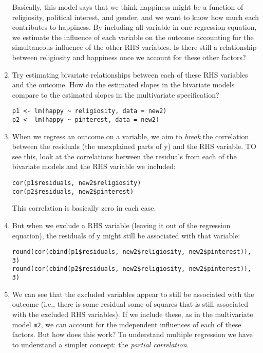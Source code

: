 \documentclass[a4paper,12pt]{article}
\begin{document}
\begin{enumerate}
\noindent Basically, this model says that we think happiness might be a function of religiosity, political interest, and gender, and we want to know how much each contributes to happiness. By including all variable in one regression equation, we estimate the influence of each variable on the outcome accounting for the simultaneous influence of the other RHS variables. Is there still a relationship between religiosity and happiness once we account for these other factors?

\item Try estimating bivariate relationships between each of these RHS variables and the outcome. How do the estimated slopes in the bivariate models compare to the estimated slopes in the multivariate specification?

\begin{verbatim}
p1 <- lm(happy ~ religiosity, data = new2)
p2 <- lm(happy ~ pinterest, data = new2)
\end{verbatim}

\item When we regress an outcome on a variable, we aim to \textit{break} the correlation between the residuals (the unexplained parts of y) and the RHS variable. TO see this, look at the correlations between the residuals from each of the bivariate models and the RHS variable we included:

\begin{verbatim}
cor(p1$residuals, new2$religiosity)
cor(p2$residuals, new2$pinterest)
\end{verbatim}

\noindent This correlation is basically zero in each case.

\item But when we exclude a RHS variable (leaving it out of the regression equation), the residuals of y might still be associated with that variable:

\begin{verbatim}
round(cor(cbind(p1$residuals, new2$religiosity, new2$pinterest)), 3)
round(cor(cbind(p2$residuals, new2$religiosity, new2$pinterest)), 3)
\end{verbatim}

\item We can see that the excluded variables appear to still be associated with the outcome (i.e., there is some residual some of squares that is still associated with the excluded RHS variables). If we include these, as in the multivariate model \texttt{m2}, we can account for the independent influences of each of these factors. But how does this work? To understand multiple regression we have to understand a simpler concept: the \textit{partial correlation}.


\end{enumerate}
\end{document}
